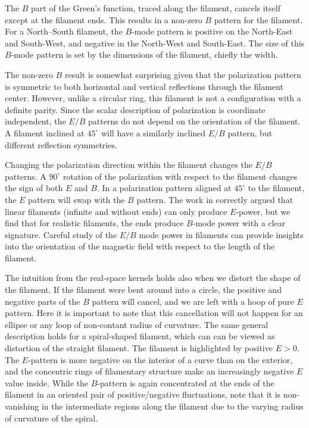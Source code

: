 The $B$ part of the Green's function, traced along the filament, cancels itself except at the filament ends.  This results in a non-zero $B$ pattern for the filament.  For a North--South filament, the $B$-mode pattern is positive on the North-East and South-West, and negative in the North-West and South-East.  The size of this $B$-mode pattern is set by the dimensions of the filament, chiefly the width.

The non-zero $B$ result is somewhat surprising given that the polarization pattern is symmetric to both horizontal and vertical reflections through the filament center.  However, unlike a circular ring, this filament is not a configuration with a definite parity.  Since the scalar description of polarization is coordinate independent, the $E/B$ patterns do not depend on the orientation of the filament.  A filament inclined at $45^\circ$ will have a similarly inclined $E/B$ pattern, but different reflection symmetries.  

Changing the polarization direction within the filament changes the $E/B$ patterns.  A $90^\circ$ rotation of the polarization with respect to the filament changes the sign of both $E$ and $B$.  In a polarization pattern aligned at $45^\circ$ to the filament, the $E$ pattern will swap with the $B$ pattern.  The work in \cite{Zaldarriaga2001a} correctly argued that linear filaments (infinite and without ends) can only produce $E$-power, but we find that for realistic filaments, the ends produce $B$-mode power with a clear signature.  Careful study of the $E/B$ mode power in filaments can provide insights into the orientation of the magnetic field with respect to the length of the filament.

The intuition from the real-space kernels holds also when we distort the shape of the filament.  If the filament were bent around into a circle, the positive and negative parts of the $B$ pattern will cancel, and we are left with a hoop of pure $E$ pattern. Here it is important to note that this cancellation will not happen for an ellipse or any loop of non-contant radius of curvature.  The same general description holds for a spiral-shaped filament, which can can be viewed as distortion of the straight filament.  The filament is highlighted by positive $E>0$.  The $E$-pattern is more negative on the interior of a curve than on the exterior, and the concentric rings of filamentary structure make an increasingly negative $E$ value inside. While the $B$-pattern is again concentrated at the ends of the filament in an oriented pair of positive/negative fluctuations, note that it is non-vanishing in the intermediate regions along the filament due to the varying radius of curvature of the spiral.

